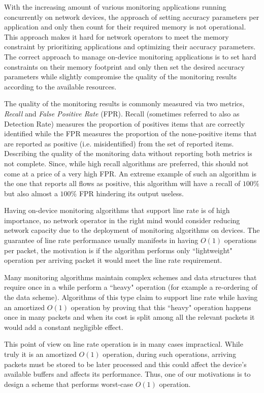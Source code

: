 With the increasing amount of various monitoring applications running concurrently on network devices, the approach of setting accuracy parameters per application and only then count for their required memory is not operational. This approach makes it hard for network operators to meet the memory constraint by prioritizing applications and optimizing their accuracy parameters. The correct approach to manage on-device monitoring applications is to set hard constraints on their memory footprint and only then set the desired accuracy parameters while slightly compromise the quality of the monitoring results according to the available resources. 

The quality of the monitoring results is commonly measured via two metrics, \textit{Recall} and \textit{False Positive Rate} (FPR). Recall (sometimes referred to also as Detection Rate) measures the proportion of positives items that are correctly identified while the FPR measures the proportion of the none-positive items that are reported as positive (i.e. misidentified) from the set of reported items.  Describing the quality of the monitoring data without reporting both metrics is not complete. Since, while high recall algorithms are preferred, this should not come at a price of a very high FPR. An extreme example of such an algorithm is the one that reports all flows as positive, this algorithm will have a recall of $100\%$ but also almost a $100\%$ FPR hindering its output useless.

Having on-device monitoring algorithms that support line rate is of high importance, no network operator in the right mind would consider reducing network capacity due to the deployment of monitoring algorithms on devices. The guarantee of line rate performance usually manifests in having $O(1)$ operations per packet, the motivation is if the algorithm performs only ``lightweight" operation per arriving packet it would meet the line rate requirement.

Many monitoring algorithms maintain complex schemes and data structures that require once in a while perform a ``heavy" operation (for example a re-ordering of the data scheme). Algorithms of this type claim to support line rate while having an amortized $O(1)$ operation by proving that this ``heavy" operation happens once in many packets and when its cost is split among all the relevant packets it would add a constant negligible effect.

This point of view on line rate operation is in many cases impractical. While truly it is an amortized $O(1)$ operation, during such operations, arriving packets must be stored to be later processed and this could affect the device's available buffers and affects its performance. Thus, one of our motivations is to design a scheme that performs worst-case $O(1)$ operation.

